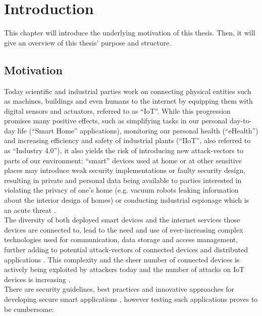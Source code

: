 \chapter{Introduction}
\label{chap:introduction}
This chapter will introduce the underlying motivation of this thesis. Then, it will give an overview of this thesis' purpose and structure. %

\section{Motivation}
Today scientific and industrial parties work on connecting physical entities such as machines, buildings and even humans to the internet by equipping them with digital sensors and actuators, referred to as \enquote{\ac{IoT}}. While this progression promises many positive effects, such as simplifying tasks in our personal day-to-day life (\enquote{Smart Home} applications), monitoring our personal health (\enquote{eHealth}) %
and increasing efficiency and safety of industrial plants (\enquote{\ac{IIoT}}, also referred to as \enquote{Industry 4.0}), it also yields the risk of introducing new attack-vectors to parts of our environment: \enquote{smart} devices used at home or at other sensitive places may introduce weak security implementations or faulty security design, resulting in private and personal data being available to parties interested in violating the privacy of one's home (e.g. vacuum robots leaking information about the interior design of homes\cite{wittenhorst_2019}) or conducting industrial espionage which is an acute threat \cite[p.~14]{bartsch2018}.\\
The diversity of both deployed smart devices and the internet services those devices are connected to, lead to the need and use of ever-increasing complex technologies used for communication, data storage and access management, further adding to potential attack-vectors of connected devices and distributed applications \cite[p.~119]{Jaeger2016}.
This complexity and the sheer number of connected devices is actively being exploited by attackers today and the number of attacks on \ac{IoT} devices is increasing \cite{demeter_preuss_shmelev_2019}.\\
There are security guidelines, best practices and innovative approaches for developing secure smart applications \cite[p.~120]{Jaeger2016}\cite[p.326-328]{Lesjak2016}, however testing such applications proves to be cumbersome: %
